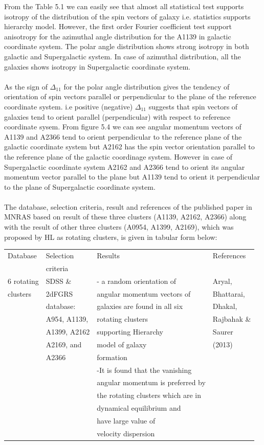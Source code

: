 \noindent From the Table 5.1 we can easily see that almost all statistical test supports isotropy of the distribution of the spin vectors of galaxy i.e. statistics supports hierarchy model. However, the first order Fourier coefficient test support anisotropy for the azimuthal angle distribution for the A1139 in galactic coordinate system. The polar angle distribution shows strong isotropy in both galactic and Supergalactic system. In case of azimuthal distribution, all the galaxies shows isotropy in Supergalactic coordinate system.\\\\
As the sign of $\Delta_{11}$ for the polar angle distribution gives the tendency of orientation  of spin vectors parallel or perpendicular to the plane of the reference coordinate system. i.e positive (negative) $\Delta_{11}$ suggests that spin vectors of galaxies tend to orient parallel (perpendicular) with respect to reference coordinate sysem. From figure 5.4 we can see angular momentum vectors of A1139 and A2366 tend to orient perpendicular to the reference plane of the galactic coordinate system but A2162 has the spin vector orientation parallel to the reference plane of the galactic coordinage system. However in case of Supergalactic coordinate system A2162 and A2366 tend to orient its angular momentum vector parallel to the plane but A1139 tend to orient it perpendicular to the plane of Supergalactic coordinate system.\\\\
The database, selection criteria, result and references of the published paper in MNRAS based on result of these three clusters (A1139, A2162, A2366) along with the result of other three clusters (A0954, A1399, A2169), which was proposed by HL as rotating clusters, is given in tabular form below:
\begin{center}
\begin{tabular}[lp=7cm]{|l|l|l|l|}
\hline\hline
Database&Selection&Results&References\\
&criteria&&\\
\hline
6 rotating&SDSS \& &- a random orientation of&Aryal,\\
clusters&2dFGRS&angular momentum vectors of&Bhattarai,\\
&database:&galaxies are found in all six&Dhakal,\\
&A954, A1139,&rotating clusters&Rajbahak \&\\
&A1399, A2162&supporting Hierarchy&Saurer\\
&A2169, and&model of galaxy&(2013)\\
&A2366&formation&\\
&&-It is found that the vanishing&\\
&&angular momentum is preferred by&\\
&&the rotating clusters which are in&\\
&&dynamical equilibrium and&\\
&&have large value of&\\
&&velocity dispersion&\\
\hline
\end{tabular}
\end{center}


